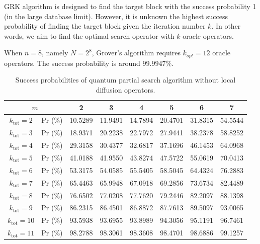 \documentclass[a4paper,10pt]{article}
\numberwithin{equation}{section}
\begin{document}
GRK algorithm is designed to find the target block with the success probability 1 (in the large database limit). However, it is unknown the highest success probability of finding the target block given the iteration number $k$. In other words, we aim to find the optimal search operator with $k$ oracle operators. 

When $n=8$, namely $N=2^8$, Grover's algorithm requires $k_{opt}=12$ oracle operators. The success probability is around $99.9947\%$. 


\begin{table}[t]
    \caption{Success probabilities of quantum partial search algorithm without local diffusion operators.}
    \centering
    \begin{tabular}{c|c|c|c|c|c|c|c}
    \hline\hline
         \multicolumn{2}{c|}{$m$} & 2 & 3 & 4 & 5 & 6 & 7 \\\hline 
         $k_\text{tot} = 2$ & Pr (\%) & 10.5289 & 11.9491 & 14.7894 & 20.4701 & 31.8315 & 54.5544 \\\hline
         $k_\text{tot} = 3$ & Pr (\%) & 18.9371 & 20.2238 & 22.7972 & 27.9441 & 38.2378 & 58.8252 \\\hline
         $k_\text{tot} = 4$ & Pr (\%) & 29.3158 & 30.4377 & 32.6817 & 37.1696 & 46.1453 & 64.0968 \\\hline
         $k_\text{tot} = 5$ & Pr (\%) & 41.0188 & 41.9550 & 43.8274 & 47.5722 & 55.0619 & 70.0413 \\\hline
         $k_\text{tot} = 6$ & Pr (\%) & 53.3175 & 54.0585 & 55.5405 & 58.5045 & 64.4324 & 76.2883 \\\hline
         $k_\text{tot} = 7$ & Pr (\%) & 65.4463 & 65.9948 & 67.0918 & 69.2856 & 73.6734 & 82.4489 \\\hline
         $k_\text{tot} = 8$ & Pr (\%) & 76.6502 & 77.0208 & 77.7620 & 79.2446 & 82.2097 & 88.1398 \\\hline
         $k_\text{tot} = 9$ & Pr (\%) & 86.2315 & 86.4501 & 86.8872 & 87.7613 & 89.5097 & 93.0065 \\\hline
         $k_\text{tot} = 10$ & Pr (\%) & 93.5938 & 93.6955 & 93.8989 & 94.3056 & 95.1191 & 96.7461 \\\hline
         $k_\text{tot} = 11$ & Pr (\%) & 98.2788 & 98.3061 & 98.3608 & 98.4701 & 98.6886 & 99.1257 \\
    \hline\hline
    \end{tabular}
    \label{tab:Grover_n=8}
\end{table}
\end{document}
